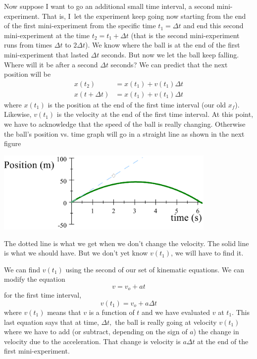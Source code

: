 \documentclass[twoside,11pt,ShortChapTitles]{BYUTextbook}
\begin{document}
Now suppose I want to go an additional small time interval, a second
mini-experiment. That is, I\ let the experiment keep going now starting from
the end of the first mini-experiment from the specific time $t_{1}=\Delta t$
and end this second mini-experiment at the time $t_{2}=t_{1}+\Delta t$ (that
is the second mini-experiment runs from times $\Delta t$ to $2\Delta t$). We
know where the ball is at the end of the first mini-experiment that lasted
$\Delta t$ seconds. But now we let the ball keep falling. Where will it be
after a second $\Delta t$ seconds? We can predict that the next position will
be
\begin{align*}
x(t_{2})  & =x(t_{1})+v(t_{1})\Delta t\\
x(t+\Delta t)  & =x(t_{1})+v(t_{1})\Delta t
\end{align*}
where $x\left(  t_{1}\right)  $ is the position at the end of the first time
interval (our old $x_{f}$). Likewise, $v\left(  t_{1}\right)  $ is the
velocity at the end of the first time interval. At this point, we have to
acknowledge that the speed of the ball is really changing. Otherwise the
ball's position vs. time graph will go in a straight line as shown in the next
figure 
\begin{center}
\includegraphics[width=0.8\textwidth]{Lab7_figs/PvTOnePoint.png}
\end{center}
The dotted line is what we get when we don't change the velocity. The solid
line is what we should have. But we don't yet know $v\left(  t_{1}\right)  $,
we will have to find it.

We can find $v\left(  t_{1}\right)  $ using the second of our set of kinematic
equations. We can modify the equation
\[
v=v_{o}+at
\]
for the first time interval,
\[
v(t_{1})=v_{o}+a\Delta t
\]
where $v(t_{1})$ means that $v$ is a function of $t$ and we have evaluated $v
$ at $t_{1}.$ This last equation says that at time, $\Delta t,$ the ball is
really going at velocity $v\left(  t_{1}\right)  $ where we have to add (or
subtract, depending on the sign of $a$) the change in velocity due to the
acceleration. That change is velocity is $a\Delta t$ at the end of the first mini-experiment.
\end{document}
